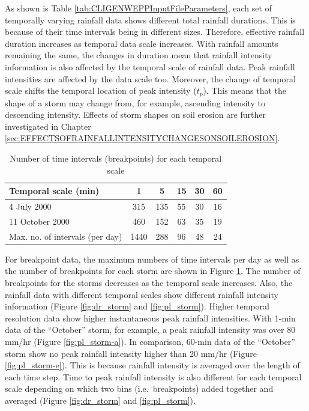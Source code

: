 As shown is Table \ref{tab:CLIGENWEPPInputFileParameters}, each set of
temporally varying rainfall data shows different total rainfall durations. This
is because of their time intervals being in different sizes. Therefore,
effective rainfall duration increases as temporal data scale increases. With
rainfall amounts remaining the same, the changes in duration mean that rainfall
intensity information is also affected by the temporal scale of rainfall data.
Peak rainfall intensities are affected by the data scale too. Moreover, the
change of temporal scale shifts the temporal location of peak intensity
($t_p$). This means that the shape of a storm may change from, for example,
ascending intensity to descending intensity. Effects of storm shapes on soil
erosion are further investigated in Chapter
\ref{sec:EFFECTSOFRAINFALLINTENSITYCHANGESONSOILEROSION}.

\begin{table}[htbp]
  \centering
  \small
  \caption{Number of time intervals (breakpoints) for each temporal scale}
  \label{tab:maxnooftimeintervalsperday}
    \begin{tabular}{lccccc}
    \toprule
    Temporal scale (min) & 1 & 5 & 15 & 30 & 60 \\ \midrule
    4 July 2000 & 315 & 135 & 55 & 30 & 16 \\
    11 October 2000 & 460 & 152 & 63 & 35 & 19 \\
    Max. no. of intervals (per day) & 1440 & 288 & 96 & 48 & 24 \\
    \bottomrule
    \end{tabular}
\end{table}

For breakpoint data, the maximum numbers of time intervals per day as well as
the number of breakpoints for each storm are shown in Figure
\ref{tab:maxnooftimeintervalsperday}. The number of breakpoints for the storms
decreases as the temporal scale increases. Also, the rainfall data with
different temporal scales show different rainfall intensity information (Figure
\ref{fig:dr_storm} and \ref{fig:pl_storm}). Higher temporal resolution data show
higher instantaneous peak rainfall intensities. With 1-min data of the
``October'' storm, for example, a peak rainfall intensity was over 80 mm/hr
(Figure \ref{fig:pl_storm-a}). In comparison, 60-min data of the ``October''
storm show no peak rainfall intensity higher than 20 mm/hr (Figure
\ref{fig:pl_storm-e}). This is because rainfall intensity is averaged over the
length of each time step. Time to peak rainfall intensity is also different for
each temporal scale depending on which two bins (i.e.\ breakpoints) added
together and averaged (Figure \ref{fig:dr_storm} and \ref{fig:pl_storm}).

